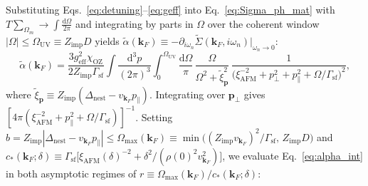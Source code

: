 \documentclass[11pt,a4paper]{article}
\numberwithin{equation}{section}
\theoremstyle{plain}
\theoremstyle{definition}
\providecommand{\vk}{\mathbf{k}}
\providecommand{\vp}{\mathbf{p}}
\providecommand{\dd}{\mathrm{d}}
\begin{document}
Substituting Eqs.~\eqref{eq:detuning}--\eqref{eq:geff} into Eq.~\eqref{eq:Sigma_ph_mat}
with $T\sum_{\Omega_m} \to \int\frac{\dd\Omega}{2\pi}$ and integrating by parts in
$\Omega$ over the coherent window $|\Omega| \le \Omega_{\mathrm{UV}} \equiv Z_{\mathrm{imp}}D$
yields $\tilde{\alpha}(\vk_F) \equiv -\partial_{i\omega_n}\tilde{\Sigma}(\vk_F,i\omega_n)|_{\omega_n\to 0}$:
\begin{equation}
    \tilde{\alpha}(\vk_F)
    = \frac{3 g_{\mathrm{eff}}^2 \chi_{\mathrm{OZ}}}{2 Z_{\mathrm{imp}} \Gamma_{\mathrm{sf}}}
      \int \frac{\dd^3 p}{(2\pi)^3} \int_0^{\Omega_{\mathrm{UV}}} \frac{\dd\Omega}{\pi}\,
      \frac{\Omega}{\Omega^2 + \tilde{\xi}_{\vp}^2}\,
      \frac{1}{\bigl(\xi_{\mathrm{AFM}}^{-2} + p_\perp^2 + p_\parallel^2
               + \Omega/\Gamma_{\mathrm{sf}}\bigr)^2},
    \label{eq:alpha_int}
\end{equation}
where $\tilde{\xi}_{\vp} \equiv Z_{\mathrm{imp}}(\Delta_{\mathrm{nest}} - v_{\vk_F}p_\parallel)$.
Integrating over $\vp_\perp$ gives
$[4\pi(\xi_{\mathrm{AFM}}^{-2} + p_\parallel^2 + \Omega/\Gamma_{\mathrm{sf}})]^{-1}$.
Setting $b = Z_{\mathrm{imp}}|\Delta_{\mathrm{nest}} - v_{\vk_F}p_\parallel| \le \Omega_{\max}(\vk_F) \equiv \min\bigl((Z_{\mathrm{imp}}v_{\vk_F})^2/\Gamma_{\mathrm{sf}},\, Z_{\mathrm{imp}}D\bigr)$
and $c_*(\vk_F;\delta) \equiv \Gamma_{\mathrm{sf}}\bigl[\xi_{\mathrm{AFM}}(\delta)^{-2} + \delta^2/(\rho(0)^2 v_{\vk_F}^2)\bigr]$,
we evaluate Eq.~\eqref{eq:alpha_int} in both asymptotic regimes of
$r \equiv \Omega_{\max}(\vk_F)/c_*(\vk_F;\delta)$:
\end{document}
